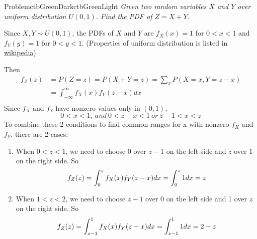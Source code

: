\documentclass[12pt]{simple_doc}
\begin{document}

    \begin{cbstripe}{Problem}{ctbGreenDark}{ctbGreenLight}
        \textit{Given two random variables $X$ and $Y$ over uniform distribution $U(0, 1)$. Find
        the PDF of $Z = X + Y$.}
    \end{cbstripe}

    Since $X, Y \sim U(0, 1)$, the PDFs of $X$ and $Y$ are $f_X(x) = 1$ for $0 < x < 1$ and
    $f_Y(y) = 1$ for $0 < y < 1$. (Properties of uniform distribution is listed in
    \href{https://en.wikipedia.org/wiki/Continuous_uniform_distribution}{wikipedia})

    Then
    \begin{equation} \label{eq:1}
		\begin{aligned}
		f_Z(z) &= P(Z = z) = P(X + Y = z) = \sum_x P(X = x, Y = z - x) \\
		   &= \int_{-\infty}^{\infty} f_X(x)f_Y(z-x)dx\\
		\end{aligned}
	\end{equation}
    Since $f_X$ and $f_Y$ have nonzero values only in $(0, 1)$,
    \begin{equation}
        0 < x < 1, \ and \ 0 < z - x < 1 \ or \ z - 1 < x < z
    \end{equation}
    To combine these 2 conditions to find common ranges for x with nonzero $f_X$ and $f_Y$, there
    are 2 cases:
    \begin{enumerate}
        \item When $0 < z < 1$, we need to choose 0 over $z-1$ on the left side and $z$ over 1 on the
              right side. So
              \begin{equation}
                  f_Z(z) = \int_{0}^{z} f_X(x)f_Y(z-x)dx\\
                         = \int_{0}^{z} 1 dx = z
              \end{equation}
        \item When $1 < z < 2$, we need to choose $z-1$ over 0 on the left side and 1 over $z$ on the
              right side. So
              \begin{equation}
                  f_Z(z) = \int_{z-1}^{1} f_X(x)f_Y(z-x)dx\\
                         = \int_{z-1}^{1} 1 dx = 2 - z
              \end{equation}
    \end{enumerate}
\end{document}

